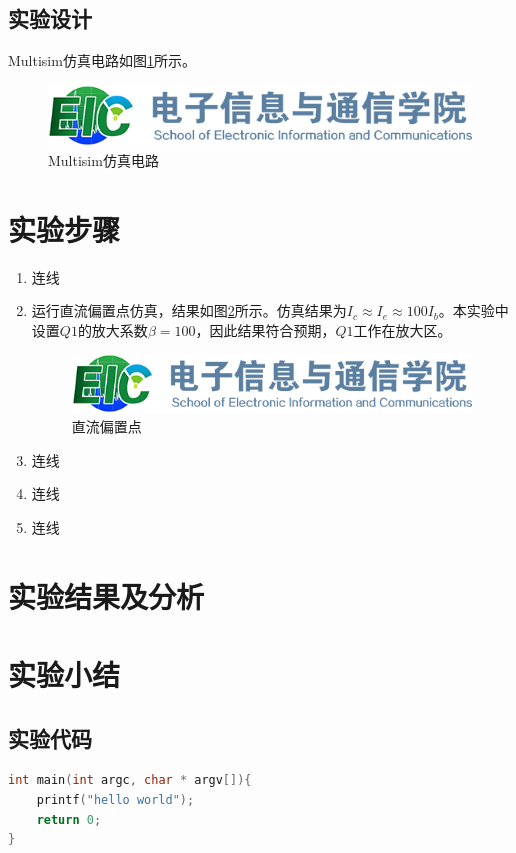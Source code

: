 \documentclass[12pt]{article}
\begin{document}
\subsection{实验设计}

Multisim仿真电路如图\ref{fig:csim}所示。

\begin{figure}[htbp]
	\centering
	\includegraphics[scale=0.3]{figures/logo-hust-eic.png}
	\caption{Multisim仿真电路}
	\label{fig:csim}
\end{figure}


\section{实验步骤}

\begin{enumerate}
	\item 连线
	\item 运行直流偏置点仿真，结果如图\ref{fig:simdc}所示。仿真结果为$I_c \approx I_e \approx 100I_b$。本实验中设置$Q1$的放大系数$\beta=100$，因此结果符合预期，$Q1$工作在放大区。

\begin{figure}[htbp]
	\centering
	\includegraphics[scale=0.3]{figures/logo-hust-eic.png}
	\caption{直流偏置点}
	\label{fig:simdc}
\end{figure}

	\item 连线
	\item 连线
	\item 连线
\end{enumerate}
	

\section{实验结果及分析}

\section{实验小结}


\begin{appendices}

\section{实验代码}
\begin{lstlisting}[language=C]
int main(int argc, char * argv[]){
    printf("hello world");
    return 0;
}
\end{lstlisting}
\end{appendices}
\end{document}
